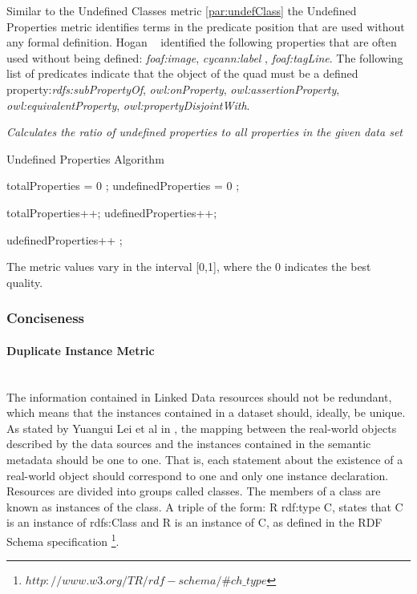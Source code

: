 {{Similar to the Undefined Classes metric \ref{par:undefClass} the Undefined Properties metric identifies terms in the predicate position that are used without any formal definition.
 Hogan  ~\cite{hogan2010} identified the following properties that are often used without being defined:  \textit{foaf:image}, \textit{cycann:label} , \textit{foaf:tagLine}.
The following list of predicates indicate that the object of the quad must be a defined property:\textit{rdfs:subPropertyOf}, \textit{owl:onProperty}, \textit{owl:assertionProperty}, \textit{owl:equivalentProperty}, \textit{owl:propertyDisjointWith}.

\begin{mdframed}[style=metricdefinition]
\emph{Calculates the ratio of undefined properties to all properties in the given data set}
\end{mdframed}

\begin{algorithm}
\caption{Undefined Properties Algorithm}
\begin{algorithmic}[1]
\State totalProperties = 0 ;
\State undefinedProperties = 0 ;
\EndProcedure

 totalProperties++; \EndIf 
{} udefinedProperties++; \EndIf

 udefinedProperties++ ; \EndIf
{}
\EndProcedure
\end{algorithmic}
\end{algorithm}

The metric values vary in the interval [0,1], where  the 0 indicates the best quality.


\subsubsection{Conciseness}

\paragraph{Duplicate Instance Metric} ~\\
The information contained in Linked Data resources should not be redundant, which means that the instances contained in a dataset should, ideally, be unique. As stated by Yuangui Lei et al in \cite{Lei2007}, the mapping between the real-world objects described by the data sources and the instances contained in the semantic metadata should be one to one. That is, each statement about the existence of a real-world object should correspond to one and only one instance declaration.
Resources are divided into groups called classes. The members of a class are known as instances of the class. A triple of the form: R rdf:type C, states that C is an instance of rdfs:Class and R is an instance of C, as defined in the RDF Schema specification \footnote{$http://www.w3.org/TR/rdf-schema/\#ch\_type$}.

}}
